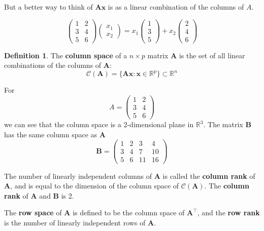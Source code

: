 \documentclass[]{book}
\theoremstyle{definition}
\newtheorem{definition}{Definition}[chapter]
\theoremstyle{definition}
\theoremstyle{definition}
\theoremstyle{remark}
\begin{document}
But a better way to think of \(\boldsymbol A\boldsymbol x\) is as a linear combination of the columns of \(A\).

\[ \left( \begin{array}{cc} 1 & 2\\ 3&4\\5&6\end{array}\right) \left(\begin{array}{c}x_1\\ x_2\end{array}\right) = x_1\left(\begin{array}{c}1\\3\\5 \end{array}\right)+x_2\left(\begin{array}{c}2\\4\\6 \end{array}\right)\]

\begin{definition}
\protect\hypertarget{def:rank}{}{\label{def:rank} }The \textbf{column space} of a \(n\times p\) matrix \(\boldsymbol A\) is the set of all linear combinations of the columns of \(\boldsymbol A\):
\[\mathcal{C}(\boldsymbol A) = \{\boldsymbol A\boldsymbol x:  \boldsymbol x\in \mathbb{R}^p\}\subset \mathbb{R}^n\]
\end{definition}

For \[A=\left( \begin{array}{cc} 1 & 2\\ 3&4\\5&6\end{array}\right) \] we can see that the column space is a 2-dimensional plane in \(\mathbb{R}^3\). The matrix \(\boldsymbol B\) has the same column space as \(\boldsymbol A\)
\[\boldsymbol B=\left( \begin{array}{cccc} 1 & 2&3 &4\\ 3&4 &7&10\\5&6&11&16\end{array}\right) \]

The number of linearly independent columns of \(\boldsymbol A\) is called the \textbf{column rank} of \(\boldsymbol A\), and is equal to the dimension of the column space of \(\mathcal{C}(\boldsymbol A)\). The \textbf{column rank} of \(\boldsymbol A\) and \(\boldsymbol B\) is 2.

The \textbf{row space} of \(\boldsymbol A\) is defined to be the column space of \(\boldsymbol A^\top\), and the \textbf{row rank} is the number of linearly independent rows of \(\boldsymbol A\).
\end{document}
